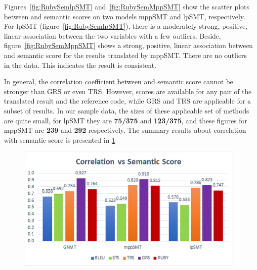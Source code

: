 Figures~\ref{fig:RubySemlpSMT} and~\ref{fig:RubySemMppSMT} show the
scatter plots between {\model} and semantic scores on two models mppSMT
and lpSMT, respectively. For lpSMT (figure~\ref{fig:RubySemlpSMT}), 
there is a moderately strong, positive, linear association between the 
two variables with a few outliers. Beside, figure~\ref{fig:RubySemMppSMT} 
shows a strong, positive, linear association between {\model} and semantic 
score for the results translated by mppSMT. There are no outliers in the data. 
This indicates the result is consistent.


In general, the correlation coefficient between {\model} and semantic score cannot be 
stronger than GRS or even TRS. However, {\model} scores are available for any pair 
of the translated result and the reference code, while GRS and TRS are applicable for 
a subset of results. In our sample data, the sizes of these applicable set of methods
are quite small, for lpSMT they are \textbf{75/375} and \textbf{123/375}, and these figures
for mppSMT are \textbf{239} and \textbf{292} respectively. The summary results about correlation with semantic score is presented in \ref{fig:summary}


	    
\begin{figure}
\centering
\includegraphics[scale=0.85]{img/summary.jpg}
\label{fig:summary}
\end{figure}